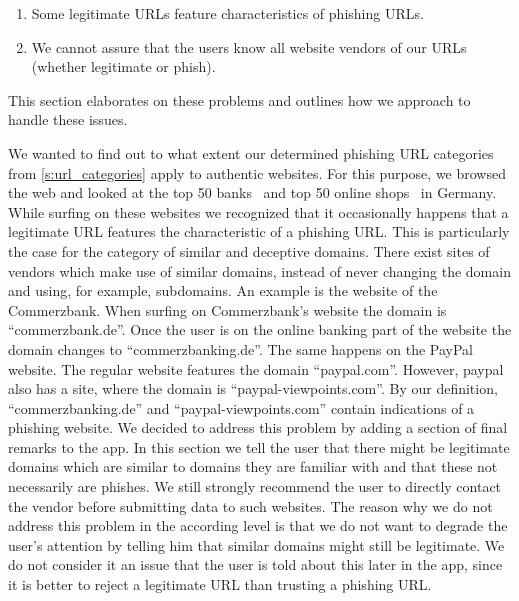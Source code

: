 \begin{enumerate}
	\item Some legitimate URLs feature characteristics of phishing URLs.
	\item We cannot assure that the users know all website vendors of our URLs (whether legitimate or phish).
\end{enumerate}
This section elaborates on these problems and outlines how we approach to handle these issues.

\begin{description}[leftmargin=0cm]
	\item[Legitimate, but Fraudulent Looking URLs:] 
We wanted to find out to what extent our determined phishing URL categories from \autoref{s:url_categories} apply to authentic websites.
For this purpose, we browsed the web and looked at the top 50 banks~\cite{bankrank} and top 50 online shops~\cite{onlineshoprank} in Germany. 
While surfing on these websites we recognized that it occasionally happens that a legitimate URL features the characteristic of a phishing URL. 
This is particularly the case for the category of similar and deceptive domains. 
There exist sites of vendors which make use of similar domains, instead of never changing the domain and using, for example, subdomains. 
An example is the website of the Commerzbank. 
When surfing on Commerzbank's website the domain is ``commerzbank.de''. 
Once the user is on the online banking part of the website the domain changes to ``commerzbanking.de''. 
The same happens on the PayPal website. 
The regular website features the domain ``paypal.com''.
However, paypal also has a site, where the domain is ``paypal-viewpoints.com''.
By our definition, ``commerzbanking.de'' and  ``paypal-viewpoints.com'' contain indications of a phishing website.
We decided to address this problem by adding a section of final remarks to the app. 
In this section we tell the user that there might be legitimate domains which are similar to domains they are familiar with and that these not necessarily are phishes. 
We still strongly recommend the user to directly contact the vendor before submitting data to such websites. 
The reason why we do not address this problem in the according level is that we do not want to degrade the user's attention by telling him that similar domains might still be legitimate. 
We do not consider it an issue that the user is told about this later in the app, since it is better to reject a legitimate URL than trusting a phishing URL. 


\end{description}
